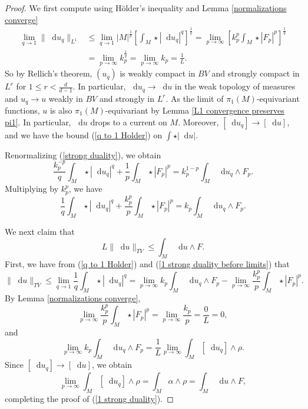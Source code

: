 \documentclass[reqno,11pt]{amsart}
\newcommand*\dif{\mathop{}\!\mathrm{d}}
\theoremstyle{definition}
\numberwithin{equation}{section}
\begin{document}
\begin{proof}
We first compute using H\"older's inequality and Lemma \ref{normalizations converge}
\begin{align*}
\lim_{q \to 1} \|\dif u_q\|_{L^1}
&\leq \lim_{q \to 1} |M|^{\frac{1}{p}} \left[\int_M \star |\dif u_q|^q\right]^{\frac{1}{q}} = \lim_{p \to \infty} \left[k_p^p \int_M \star |F_p|^p\right]^{\frac{1}{q}} \\
&= \lim_{p \to \infty} k_p^{\frac{1}{q}} = \lim_{p \to \infty} k_p = \frac{1}{L}.
\end{align*}
So by Rellich's theorem, $(u_q)$ is weakly compact in $BV$ and strongly compact in $L^r$ for $1 \leq r < \frac{d}{d - 1}$.
In particular, $\dif u_q \to \dif u$ in the weak topology of measures and $u_q \to u$ weakly in $BV$ and strongly in $L^r$.
As the limit of $\pi_1(M)$-equivariant functions, $u$ is also $\pi_1(M)$-equivariant by Lemma \ref{L1 convergence preserves pi1}.
In particular, $\dif u$ drops to a current on $M$.
Moreover, $[\dif u_q] \to [\dif u]$, and we have the bound (\ref{q to 1 Holder}) on $\int \star |\dif u|$.

Renormalizing (\ref{strong duality}), we obtain 
$$\frac{k_p^{-p}}{q} \int_M \star |\dif u_q|^q + \frac{1}{p} \int_M \star |F_p|^p = k_p^{1 - p} \int_M \dif u_q \wedge F_p.$$
Multiplying by $k_p^p$, we have 
\begin{equation}\label{1 strong duality before limits}
	\frac{1}{q} \int_M \star |\dif u_q|^q + \frac{k_p^p}{p} \int_M \star |F_p|^p = k_p \int_M \dif u_q \wedge F_p.
\end{equation}

We next claim that
\begin{equation}\label{1 strong duality}
	L \|\dif u\|_{TV} \leq \int_M \dif u \wedge F.
\end{equation}
First, we have from (\ref{q to 1 Holder}) and (\ref{1 strong duality before limits}) that
$$\|\dif u\|_{TV} \leq \lim_{q \to 1} \frac{1}{q} \int_M \star |\dif u_q|^q = \lim_{p \to \infty} k_p \int_M \dif u_q \wedge F_p - \lim_{p \to \infty} \frac{k_p^p}{p} \int_M \star |F_p|^p.$$
By Lemma \ref{normalizations converge},
$$\lim_{p \to \infty} \frac{k_p^p}{p} \int_M \star |F_p|^p = \lim_{p \to \infty} \frac{k_p}{p} = \frac{0}{L} = 0,$$
and
$$\lim_{p \to \infty} k_p \int_M \dif u_q \wedge F_p = \frac{1}{L} \lim_{p \to \infty} \int_M [\dif u_q] \wedge \rho.$$
Since $[\dif u_q] \to [\dif u]$, we obtain
$$\lim_{p \to \infty} \int_M [\dif u_q] \wedge \rho = \int_M \alpha \wedge \rho = \int_M \dif u \wedge F,$$
completing the proof of (\ref{1 strong duality}).


\end{proof}
\end{document}
